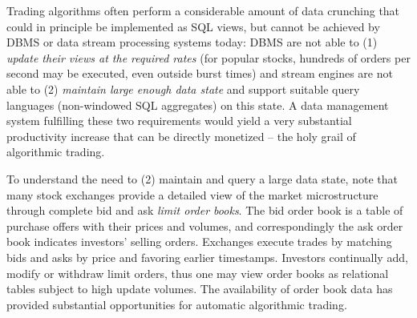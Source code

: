 
Trading algorithms often perform a considerable amount of data crunching that
could in principle be implemented as SQL views, but cannot be achieved by DBMS
or data stream processing systems today: DBMS are not able to (1) {\em update
their views at the required rates}\/ (for popular stocks, hundreds of orders per
second may be executed, even outside burst times) and stream engines are not
able to (2) {\em maintain large enough data state}\/ and support suitable query
languages (non-windowed SQL aggregates) on this state.
A data management system fulfilling these two requirements would yield a very
substantial productivity increase that can be directly monetized -- the holy
grail of algorithmic trading.



To understand the need to (2) maintain and query a large data state, note that
many stock exchanges provide a detailed view of the market microstructure
through complete bid and ask {\em limit order books}. The bid order book is a
table of purchase offers with their prices and volumes, and correspondingly the
ask order book indicates investors' selling orders. Exchanges execute trades by
matching bids and asks by price and favoring earlier timestamps. Investors
continually add, modify or withdraw limit orders, thus one may view order books
as relational tables subject to high update volumes. The availability of order
book data has provided substantial opportunities for automatic algorithmic
trading.





